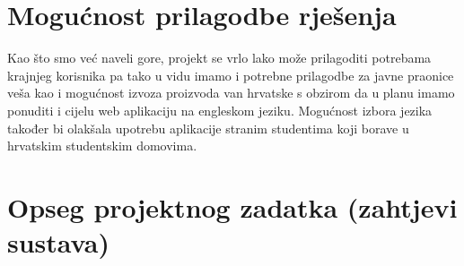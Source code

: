 		\section{Mogućnost prilagodbe rješenja}
			
			{Kao što smo već naveli gore, projekt se vrlo lako može prilagoditi potrebama krajnjeg korisnika pa tako u
			vidu imamo i potrebne prilagodbe za javne praonice veša kao i mogućnost izvoza proizvoda van hrvatske
			s obzirom da u planu imamo ponuditi i cijelu web aplikaciju na engleskom jeziku. Mogućnost izbora
			jezika također bi olakšala upotrebu aplikacije stranim studentima koji borave u hrvatskim studentskim
			domovima.}
			
		\section{Opseg projektnog zadatka (zahtjevi sustava)}
		
